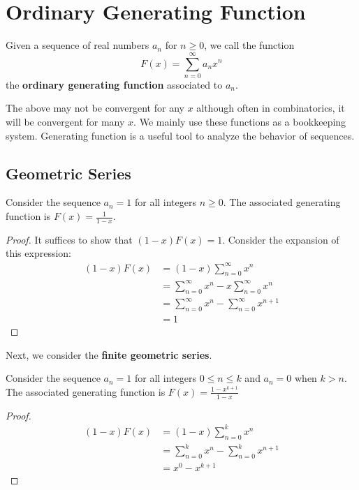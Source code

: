 \section{Ordinary Generating Function}

\begin{definition}
    Given a sequence of real numbers $a_n$ for $n \geq 0$, we call the function
    $$
    F(x) = \sum_{n=0}^\infty a_n x^n
    $$
    the \textbf{ordinary generating function} associated to $a_n$.
\end{definition}

The above may not be convergent for any $x$ although often in combinatorics, it will be convergent for many $x$. We mainly use these functions as a bookkeeping system. Generating function is a useful tool to analyze the behavior of sequences.

\subsection{Geometric Series}

\begin{theorem}
    Consider the sequence $a_n = 1$ for all integers $n \geq 0$. The associated generating function is $F(x) = \frac{1}{1-x}$.
\end{theorem}

\begin{proof}
    It suffices to show that $(1-x) F(x) = 1$. Consider the expansion of this expression:
    $$
    \begin{aligned}
        (1-x) F(x) &= (1-x) \sum_{n=0}^\infty x^n \\
        &= \sum_{n=0}^\infty x^n - x \sum_{n=0}^\infty x^n \\
        &= \sum_{n=0}^\infty x^n - \sum_{n=0}^\infty x^{n+1} \\
        &= 1
    \end{aligned}
    $$
\end{proof}

Next, we consider the \textbf{finite geometric series}.

\begin{theorem}
    Consider the sequence $a_n = 1$ for all integers $0 \leq n \leq k$ and $a_n = 0$ when $k > n$. The associated generating function is $F(x) = \frac{1-x^{k+1}}{1-x}$
\end{theorem}

\begin{proof}
    $$
    \begin{aligned}
        (1-x)F(x) &= (1-x) \sum_{n=0}^k x^n \\
        &= \sum_{n=0}^k x^n - \sum_{n=0}^k x^{n+1} \\
        &= x^0 - x^{k+1}
    \end{aligned}
    $$
\end{proof}

